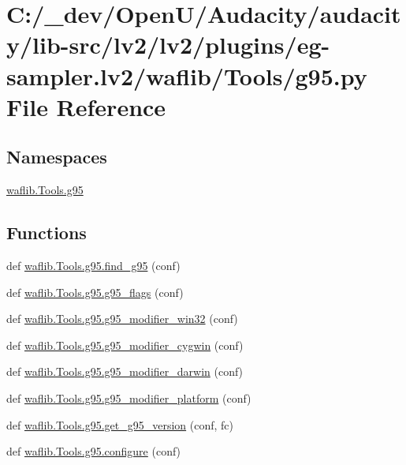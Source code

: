 \hypertarget{lv2_2plugins_2eg-sampler_8lv2_2waflib_2_tools_2g95_8py}{}\section{C\+:/\+\_\+dev/\+Open\+U/\+Audacity/audacity/lib-\/src/lv2/lv2/plugins/eg-\/sampler.lv2/waflib/\+Tools/g95.py File Reference}
\label{lv2_2plugins_2eg-sampler_8lv2_2waflib_2_tools_2g95_8py}
\subsection*{Namespaces}
\begin{DoxyCompactItemize}
\item 
 \hyperlink{namespacewaflib_1_1_tools_1_1g95}{waflib.\+Tools.\+g95}
\end{DoxyCompactItemize}
\subsection*{Functions}
\begin{DoxyCompactItemize}
\item 
def \hyperlink{namespacewaflib_1_1_tools_1_1g95_a3be6ad150899555106884ccd7f485782}{waflib.\+Tools.\+g95.\+find\+\_\+g95} (conf)
\item 
def \hyperlink{namespacewaflib_1_1_tools_1_1g95_a219eb212c9e3c16c14c4be4c75fe81cc}{waflib.\+Tools.\+g95.\+g95\+\_\+flags} (conf)
\item 
def \hyperlink{namespacewaflib_1_1_tools_1_1g95_a13f942cc0288d10a196243598d9ba608}{waflib.\+Tools.\+g95.\+g95\+\_\+modifier\+\_\+win32} (conf)
\item 
def \hyperlink{namespacewaflib_1_1_tools_1_1g95_a3363ec27e958d5ce39d5556234385475}{waflib.\+Tools.\+g95.\+g95\+\_\+modifier\+\_\+cygwin} (conf)
\item 
def \hyperlink{namespacewaflib_1_1_tools_1_1g95_a67982aa3652753344baa933e39fe4076}{waflib.\+Tools.\+g95.\+g95\+\_\+modifier\+\_\+darwin} (conf)
\item 
def \hyperlink{namespacewaflib_1_1_tools_1_1g95_a9faf0774c7c31790a714ca21fdb9806b}{waflib.\+Tools.\+g95.\+g95\+\_\+modifier\+\_\+platform} (conf)
\item 
def \hyperlink{namespacewaflib_1_1_tools_1_1g95_a753e499b2ec1d9c6960514b2f66c5b34}{waflib.\+Tools.\+g95.\+get\+\_\+g95\+\_\+version} (conf, fc)
\item 
def \hyperlink{namespacewaflib_1_1_tools_1_1g95_a7cb58685ba6d130068f6a04dc68383a1}{waflib.\+Tools.\+g95.\+configure} (conf)
\end{DoxyCompactItemize}

